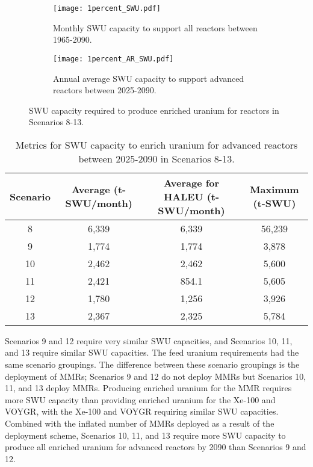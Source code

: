 \begin{figure}[h!]
    \centering
    \begin{subfigure}[b]{0.45\textwidth}
        \centering
        \texttt{[image: 1percent\_SWU.pdf]}
        \caption{Monthly \gls{SWU} capacity to support all reactors between 1965-2090.}
        \label{fig:1percent_all_SWU}
    \end{subfigure}
    \hfill
    \begin{subfigure}[b]{0.45\textwidth}
        \centering
        \texttt{[image: 1percent\_AR\_SWU.pdf]}
        \caption{Annual average \gls{SWU} capacity to support advanced reactors between 2025-2090.}
        \label{fig:1percent_AR_SWU}
    \end{subfigure}
       \caption{\gls{SWU} capacity required to produce enriched uranium 
       for reactors in Scenarios 8-13.}
       \label{fig:1percent_swu}
\end{figure}

\begin{table}[h!]
    \centering 
    \caption{Metrics for \gls{SWU} capacity to enrich uranium for 
    advanced reactors between 2025-2090 in Scenarios 8-13.}
    \label{tab:1percent_swu}
    \begin{tabular}{c c c c}
        \hline
        Scenario & Average (t-SWU/month) & Average  
        for \gls{HALEU} (t-SWU/month) & Maximum (t-SWU)\\\hline
        8 & 6,339 & 6,339 & 56,239 \\
        9 & 1,774 & 1,774 & 3,878\\
        10 & 2,462 & 2,462 & 5,600\\
        11 & 2,421 & 854.1 & 5,605\\
        12 & 1,780 & 1,256 & 3,926\\
        13 & 2,367 & 2,325 & 5,784\\
        \hline
    \end{tabular}
\end{table}

Scenarios 9 and 12 require very similar \gls{SWU} capacities, and 
Scenarios 10, 11, and 13 require similar \gls{SWU} capacities. 
The feed uranium requirements had the same scenario groupings. 
The difference between these scenario groupings is the deployment 
of \glspl{MMR}; Scenarios 9 and 12 do not deploy \glspl{MMR} but 
Scenarios 10, 11, and 13 deploy \glspl{MMR}. Producing enriched uranium 
for the \gls{MMR} requires more \gls{SWU} capacity than providing 
enriched uranium for the Xe-100 and VOYGR, with the Xe-100 and VOYGR 
requiring similar \gls{SWU} capacities. Combined with the inflated 
number of \glspl{MMR} deployed as a result of the deployment scheme, 
Scenarios 10, 11, and 13 require more \gls{SWU} capacity to produce 
all enriched uranium for advanced reactors by 2090 than Scenarios 9 and 12. 


